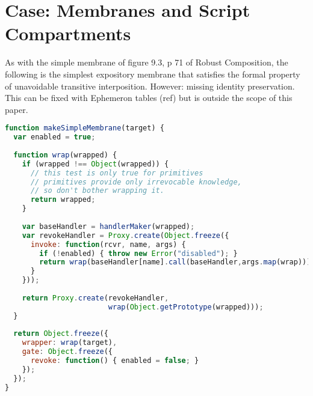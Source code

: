 \documentclass[10pt,legalpaper]{article}
\begin{document}
%
%
%
%

\section{Case: Membranes and Script Compartments}

As with the simple membrane of figure 9.3, p 71 of Robust Composition, the following is the simplest expository membrane that satisfies the formal property of unavoidable transitive interposition.
However: missing identity preservation. This can be fixed with Ephemeron tables (ref) but is outside the scope of this paper.

\begin{lstlisting}[language=javascript]
function makeSimpleMembrane(target) {
  var enabled = true;
  
  function wrap(wrapped) {
    if (wrapped !== Object(wrapped)) {
      // this test is only true for primitives
      // primitives provide only irrevocable knowledge,
      // so don't bother wrapping it.
      return wrapped;
    }
 
    var baseHandler = handlerMaker(wrapped);
    var revokeHandler = Proxy.create(Object.freeze({
      invoke: function(rcvr, name, args) {
        if (!enabled) { throw new Error("disabled"); }
        return wrap(baseHandler[name].call(baseHandler,args.map(wrap)));
      }
    }));
          
    return Proxy.create(revokeHandler, 
                        wrap(Object.getPrototype(wrapped)));
  }
    
  return Object.freeze({
    wrapper: wrap(target),
    gate: Object.freeze({
      revoke: function() { enabled = false; }
    });
  });
}
\end{lstlisting}
\end{document}

